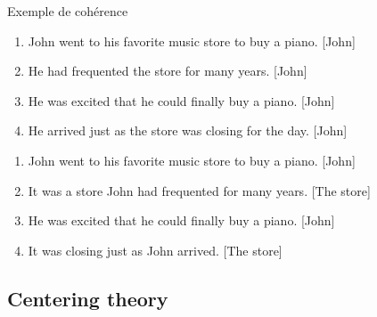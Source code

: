 \documentclass{KodeBook}
\begin{document}
\begin{exampleblock}{Exemple de cohérence \cite{2019-jurafsky-martin}}
	\small
	\begin{minipage}{.48\textwidth}
		\begin{enumerate}
			\item John went to his favorite music store to buy a piano. [John]
			\item He had frequented the store for many years. [John]
			\item He was excited that he could finally buy a piano. [John]
			\item He arrived just as the store was closing for the day. [John]
		\end{enumerate}
	\end{minipage}
	\begin{minipage}{.48\textwidth}
		\begin{enumerate}
			\item John went to his favorite music store to buy a piano. [John]
			\item It was a store John had frequented for many years. [The store]
			\item He was excited that he could finally buy a piano. [John]
			\item It was closing just as John arrived. [The store]
		\end{enumerate}
	\end{minipage}
\end{exampleblock}

\subsection{Centering theory}
\end{document}
